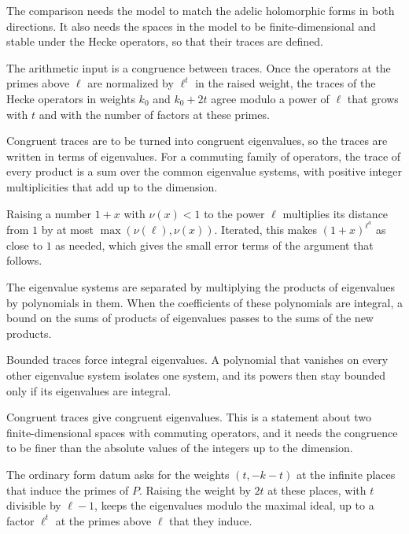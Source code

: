 The comparison needs the model to match the adelic holomorphic forms in both directions. It also needs the spaces in the model to be finite-dimensional and stable under the Hecke operators, so that their traces are defined.

The arithmetic input is a congruence between traces. Once the operators at the primes above $\ell$ are normalized by $\ell^t$ in the raised weight, the traces of the Hecke operators in weights $k_0$ and $k_0+2t$ agree modulo a power of $\ell$ that grows with $t$ and with the number of factors at these primes.

Congruent traces are to be turned into congruent eigenvalues, so the traces are written in terms of eigenvalues. For a commuting family of operators, the trace of every product is a sum over the common eigenvalue systems, with positive integer multiplicities that add up to the dimension.

Raising a number $1+x$ with $\nu(x)<1$ to the power $\ell$ multiplies its distance from $1$ by at most $\max(\nu(\ell),\nu(x))$. Iterated, this makes $(1+x)^{\ell^a}$ as close to $1$ as needed, which gives the small error terms of the argument that follows.

The eigenvalue systems are separated by multiplying the products of eigenvalues by polynomials in them. When the coefficients of these polynomials are integral, a bound on the sums of products of eigenvalues passes to the sums of the new products.

Bounded traces force integral eigenvalues. A polynomial that vanishes on every other eigenvalue system isolates one system, and its powers then stay bounded only if its eigenvalues are integral.

Congruent traces give congruent eigenvalues. This is a statement about two finite-dimensional spaces with commuting operators, and it needs the congruence to be finer than the absolute values of the integers up to the dimension.

The ordinary form datum asks for the weights $(t,-k-t)$ at the infinite places that induce the primes of $P$. Raising the weight by $2t$ at these places, with $t$ divisible by $\ell-1$, keeps the eigenvalues modulo the maximal ideal, up to a factor $\ell^t$ at the primes above $\ell$ that they induce.

